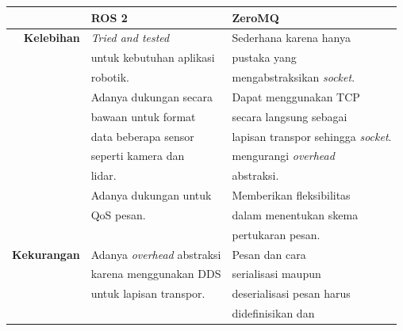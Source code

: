 \begin{table}[!htbp]
	\centering
	\begin{tabular}{| r | l | l |}
		\hline
		                    & \textbf{ROS 2}                     & \textbf{ZeroMQ}                                    \\
		\hline
		\textbf{Kelebihan}  & \textit{Tried and tested}          & Sederhana karena hanya                             \\
		                    & untuk kebutuhan aplikasi           & pustaka yang                                       \\
		                    & robotik.                           & mengabstraksikan \textit{socket}.                  \\
		\cline{2-3}
		                    & Adanya dukungan secara             & Dapat menggunakan TCP                              \\
		                    & bawaan untuk format                & secara langsung sebagai                            \\
		                    & data beberapa sensor               & lapisan transpor sehingga         \textit{socket}. \\
		                    & seperti kamera dan                 & mengurangi \textit{overhead}                       \\
		                    & lidar.                             & abstraksi.                                         \\
		\cline{2-3}
		                    & Adanya dukungan untuk              & Memberikan fleksibilitas                           \\
		                    & QoS pesan.                         & dalam menentukan skema                             \\
		                    &                                    & pertukaran pesan.                                  \\
		\hline
		\textbf{Kekurangan} & Adanya \textit{overhead} abstraksi & Pesan dan cara                                     \\
		                    & karena menggunakan DDS             & serialisasi maupun                                 \\
		                    & untuk lapisan transpor.            & deserialisasi pesan harus                          \\
		                    &                                    & didefinisikan dan                                  \\

\end{tabular}
\end{table}
